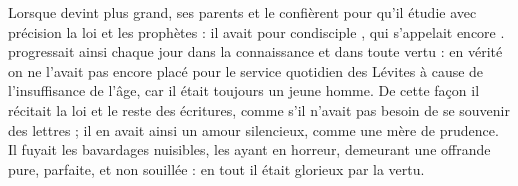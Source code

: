 Lorsque  devint plus grand, ses parents 
et le confièrent pour qu'il étudie avec précision la loi et les prophètes   :%
il avait pour condisciple , qui s'appelait encore .
 progressait ainsi chaque jour dans la connaissance et dans toute  vertu :
en vérité on ne  l'avait pas encore placé pour le service quotidien des Lévites à cause de l'insuffisance de l'âge, car il était toujours un jeune homme.
De cette façon il récitait la loi et le reste des écritures, comme s'il n'avait pas besoin de se  souvenir des lettres ; il en avait ainsi un amour silencieux, comme une mère de prudence. 
Il fuyait les bavardages nuisibles, les ayant en horreur, demeurant une offrande pure, parfaite, et non souillée : en tout il était glorieux par la vertu. %



